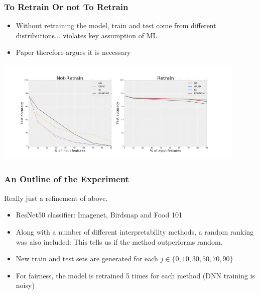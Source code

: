\documentclass{beamer}
\theoremstyle{mystyle}
\begin{document}
\begin{frame}
	\frametitle{To Retrain Or not To Retrain}
	\begin{itemize}
	\item Without retraining the model, train and test come from different distributions... violates key assumption of ML \pause
	\item Paper therefore argues it is necessary \pause
	\end{itemize}
	\includegraphics[width=12cm, height=5cm]{retrain_vs_not.png}
\end{frame}
\begin{frame}
	\frametitle{An Outline of the Experiment}
	Really just a refinement of above.
	\begin{itemize}
		\item ResNet50 classifier: Imagenet, Birdsnap and Food 101\pause
		\item Along with a number of different interpretability methods, a random ranking was also included: This tells us if the method outperforms random.\pause
		\item  New train and test sets are generated for each $j \in \{0,10,30,50,70,90\} $\pause
		\item For fairness, the model is retrained 5 times for each method (DNN training is noisy) \pause
	\end{itemize}
\end{frame}
\end{document}
